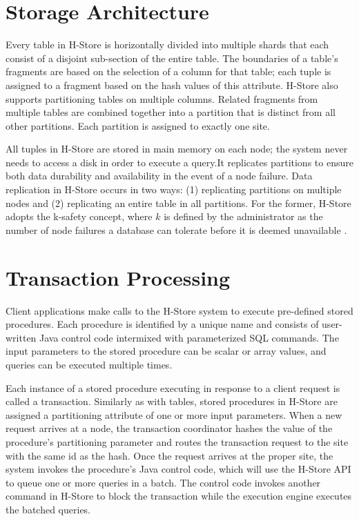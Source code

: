 \documentclass[9pt,twocolumn,twoside]{../../styles/osajnl}
\begin{document}
\section{Storage Architecture}

Every table in H-Store is horizontally divided into multiple shards that each 
consist of a disjoint sub-section of the entire table. The boundaries of a 
table’s fragments are based on the selection of a  column for that table; 
each tuple is assigned to a fragment based on the hash values of this 
attribute. H-Store also supports partitioning tables on multiple columns. 
Related fragments from multiple tables are combined together into a partition 
that is distinct from all other partitions. Each partition is assigned to 
exactly one site.

All tuples in H-Store are stored in main memory on each node; the system never 
needs to access a disk in order to execute a query.It replicates partitions to 
ensure both data durability and availability in the event of a node failure. 
Data replication in H-Store occurs in two ways: (1) replicating partitions on 
multiple nodes and (2) replicating an entire table in all partitions. For the 
former, H-Store adopts the k-safety concept, where $k$ is defined by the 
administrator as the number of node failures a database can tolerate before it 
is deemed unavailable \cite{www-H-StoreArch}.

\section{Transaction Processing}

Client applications make calls to the H-Store system to execute pre-defined 
stored procedures. Each procedure is identified by a unique name and consists 
of user-written Java control code intermixed with parameterized SQL commands. 
The input parameters to the stored procedure can be scalar or array values, and queries can be executed multiple times.

Each instance of a stored procedure executing in response to a client request 
is called a transaction. Similarly as with tables, stored procedures in H-Store are assigned a partitioning attribute of one or more input parameters. When a 
new request arrives at a node, the transaction coordinator hashes the value of 
the procedure’s partitioning parameter and routes the transaction request to 
the site with the same id as the hash. Once the request arrives at the proper 
site, the system invokes the procedure’s Java control code, which will use 
the H-Store API to queue one or more queries in a batch. The control code 
invokes another command in H-Store to block the transaction while the execution engine executes the batched queries.
\end{document}
